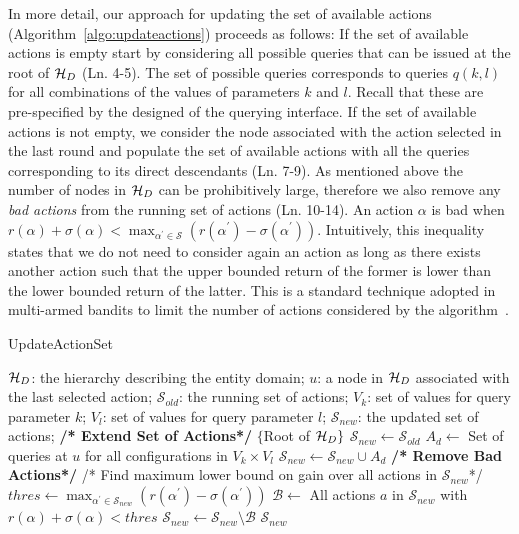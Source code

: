In more detail, our approach for updating the set of available actions (Algorithm~\ref{algo:updateactions}) proceeds as follows: If the set of available actions is empty start by considering all possible queries that can be issued at the root of $\mathcal{H}_D$ (Ln. 4-5). The set of possible queries corresponds to queries $q(k,l)$ for all combinations of the values of parameters $k$ and $l$. Recall that these are pre-specified by the designed of the querying interface. If the set of available actions is not empty, we consider the node associated with the action selected in the last round and populate the set of available actions with all the queries corresponding to its direct descendants (Ln. 7-9). As mentioned above the number of nodes in $\mathcal{H}_D$ can be prohibitively large, therefore we also remove any {\em bad actions} from the running set of actions (Ln.  10-14). 
An action $\alpha$ is bad when $r(\alpha) + \sigma(\alpha) < \max_{\alpha^{\prime} \in \mathcal{S}} (r(\alpha^{\prime}) - \sigma(\alpha^{\prime}))$. Intuitively, this inequality states that we do not need to consider again an action as long as there exists another action such that the upper bounded return of the former is lower than the lower bounded return of the latter. This is a standard technique adopted in multi-armed bandits to limit the number of actions considered by the algorithm~\cite{EvenDar06actionelimination}. 


\begin{algorithm}[h]
\small\caption{UpdateActionSet}
\label{algo:updateactions}
\begin{algorithmic}[1]
 $\mathcal{H}_D$: the hierarchy describing the entity domain; $u$: a node in $\mathcal{H}_D$ associated with the last selected action; $\mathcal{S}_{old}$: the running set of actions; $V_k$: set of values for query parameter $k$; $V_l$: set of values for query parameter $l$;
 $\mathcal{S}_{new}$: the updated set of actions;
\STATE \textbf{/* Extend Set of Actions*/}
	\RETURN $\{$Root of $\mathcal{H}_D \}$
\ENDIF 
\STATE $\mathcal{S}_{new} \leftarrow \mathcal{S}_{old}$
\STATE $A_d \leftarrow$ Set of queries at $u$ for all configurations in $V_k \times V_l$
\STATE $\mathcal{S}_{new} \leftarrow \mathcal{S}_{new} \cup A_d$
\ENDFOR
\STATE \textbf{/* Remove Bad Actions*/}
\STATE /* Find maximum lower bound on gain over all actions in $\mathcal{S}_{new}$*/
\STATE $thres \leftarrow \max_{\alpha^{\prime} \in \mathcal{S}_{new}} (r(\alpha^{\prime}) - \sigma(\alpha^{\prime}))$  
\STATE $\mathcal{B} \leftarrow$ All actions $a$ in $\mathcal{S}_{new}$ with $r(\alpha) + \sigma(\alpha) < thres$
\STATE $\mathcal{S}_{new} \leftarrow \mathcal{S}_{new} \setminus \mathcal{B}$
\RETURN $\mathcal{S}_{new}$
\end{algorithmic}
\end{algorithm}
\vspace{-20pt}